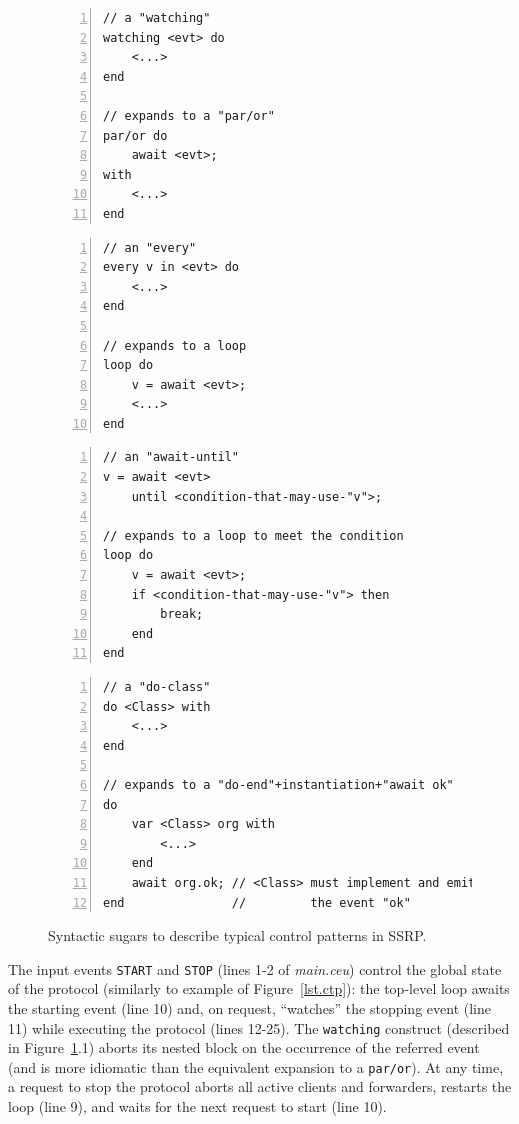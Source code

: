 \documentclass[preprint]{sigplanconf}
\newcommand{\code}[1] {{\small{\texttt{#1}}}}
\newcommand{\1}{\;}
\newcommand{\2}{\;\;}
\newcommand{\3}{\;\;\;}
\newcommand{\5}{\;\;\;\;\;}
\begin{document}
\begin{figure}%
\begin{lstlisting}[numbers=left,xleftmargin=3em,title=(1) A \code{watching} 
expands to a \code{par/or}.]
// a "watching"
watching <evt> do
    <...>
end

// expands to a "par/or"
par/or do
    await <evt>;
with
    <...>
end
\end{lstlisting}
\begin{lstlisting}[numbers=left,xleftmargin=3em,title=(2) An \code{every} 
expands to a \code{loop}.]
// an "every"
every v in <evt> do
    <...>
end

// expands to a loop
loop do
    v = await <evt>;
    <...>
end
\end{lstlisting}
\begin{lstlisting}[numbers=left,xleftmargin=3em,title=(3) An \code{await-until} 
expands to a \code{loop} to meet the condition.]
// an "await-until"
v = await <evt>
    until <condition-that-may-use-"v">;

// expands to a loop to meet the condition
loop do
    v = await <evt>;
    if <condition-that-may-use-"v"> then
        break;
    end
end
\end{lstlisting}
\begin{lstlisting}[numbers=left,xleftmargin=3em,title=(4) A \code{do-<class>} 
waits for the organism to terminate.]
// a "do-class"
do <Class> with
    <...>
end

// expands to a "do-end"+instantiation+"await ok"
do
    var <Class> org with
        <...>
    end
    await org.ok; // <Class> must implement and emit
end               //         the event "ok"
\end{lstlisting}
\caption{ Syntactic sugars to describe typical control patterns in SSRP.
\label{fig.sugars}
}
\end{figure}


The input events \code{START} and \code{STOP} (lines 1-2 of \emph{main.ceu}) 
control the global state of the protocol (similarly to example of 
Figure~\ref{lst.ctp}):
the top-level loop awaits the starting event (line 10) and, on request, 
``watches'' the stopping event (line 11) while executing the protocol (lines 
12-25).
The \code{watching} construct (described in Figure~\ref{fig.sugars}.1) aborts 
its nested block on the occurrence of the referred event (and is more idiomatic 
than the equivalent expansion to a \code{par/or}).
%
At any time, a request to stop the protocol aborts all active clients and 
forwarders, restarts the loop (line 9), and waits for the next request to start 
(line 10).
\end{document}
